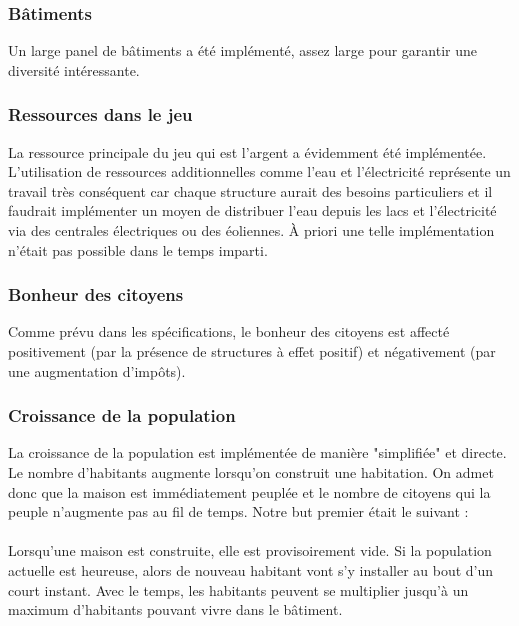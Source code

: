 \documentclass[a4paper,10pt,openany,oneside]{report}
\begin{document}
\subsubsection{Bâtiments}
Un large panel de bâtiments a été implémenté, assez large pour garantir une diversité intéressante.

\subsubsection{Ressources dans le jeu}
La ressource principale du jeu qui est l'argent a évidemment été implémentée. L'utilisation de ressources additionnelles comme l'eau et l'électricité représente un travail très conséquent car chaque structure aurait des besoins particuliers et il faudrait implémenter un moyen de distribuer l'eau depuis les lacs et l'électricité via des centrales électriques ou des éoliennes. À priori une telle implémentation n'était pas possible dans le temps imparti. 

\subsubsection{Bonheur des citoyens}
Comme prévu dans les spécifications, le bonheur des citoyens est affecté positivement (par la présence de structures à effet positif) et négativement (par une augmentation d'impôts). 

\subsubsection{Croissance de la population}
La croissance de la population est implémentée de manière "simplifiée" et directe. Le nombre d'habitants augmente lorsqu'on construit une habitation. On admet donc que la maison est immédiatement peuplée et le nombre de citoyens qui la peuple n'augmente pas au fil de temps.
Notre but premier était le suivant :
\paragraph{}
Lorsqu'une maison est construite, elle est provisoirement vide. Si la population actuelle est heureuse, alors de nouveau habitant vont s'y installer au bout d'un court instant. Avec le temps, les habitants peuvent se multiplier jusqu'à un maximum d'habitants pouvant vivre dans le bâtiment.
\end{document}
